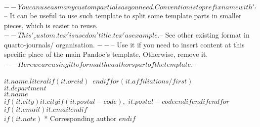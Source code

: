 $-- You can use as many custom partials as you need. Convention is to prefix name with '_'
$-- It can be useful to use such template to split some template parts in smaller pieces, which is easier to reuse.
$-- This '_custom.tex' is used on 'title.tex' as example.
$-- See other existing format in quarto-journals/ organisation.
$-- %
$-- Use it if you need to insert content at this specific place of the main Pandoc's template. Otherwise, remove it.
$-- Here we are using it to format the authors part of the template.
$-- %

\textbf{$it.name.literal$}$if(it.orcid)$~$endif$$for(it.affiliations/first)$\\$it.department$\\$it.name$\\$if(it.city)$$it.city$$if(it.postal-code)$,\ $it.postal-code$$endif$$endif$$endfor$\\$if(it.email)$\href{mailto:$it.email$}{$it.email$}$endif$\\$if(it.note)$ * Corresponding author $endif$
